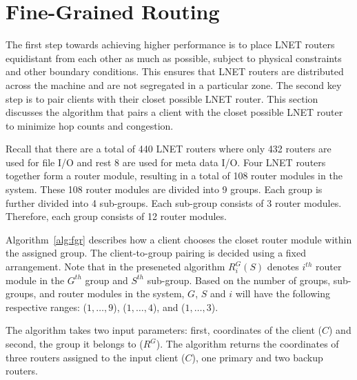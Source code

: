 \section{Fine-Grained Routing}


The first step towards achieving higher performance is to place LNET routers equidistant from each other as much as possible,
subject to physical constraints and other boundary conditions. This ensures that LNET routers are distributed across the machine
and are not segregated in a particular zone. The second key step is to pair clients with their closet possible LNET router. This 
section discusses the algorithm that pairs a client with the closet possible LNET router to minimize hop counts and congestion.

Recall that there are a total of 440 LNET routers where only 432 routers are used for file I/O and rest 8 are used for meta 
data I/O. Four LNET routers together form a router module, resulting in a total of 108 router modules in the system. These 
108 router modules are divided into 9 groups. Each group is further divided into 4 sub-groups. Each sub-group consists of 3 router modules. Therefore, each group consists of 12 router modules.


Algorithm~\ref{alg:fgr} describes how a client chooses the closet router module within the assigned group. The 
client-to-group pairing is decided using a fixed arrangement. Note that in the preseneted algorithm $R^G_{i}(S)$ 
denotes $i^{th}$ router module in the $G^{th}$ group and $S^{th}$ sub-group. Based on the number of groups, sub-groups, and 
router modules in the system, $G$, $S$ and $i$ will have the following respective ranges: ($1, \dots, 9$), ($1, \dots, 4$), 
and ($1, \dots, 3$).


The algorithm takes two input parameters: first, coordinates of the client ($C$) and second, the group it belongs to ($R^G$). The 
algorithm returns the coordinates of three routers assigned to the input client ($C$), one primary and two backup routers. 

